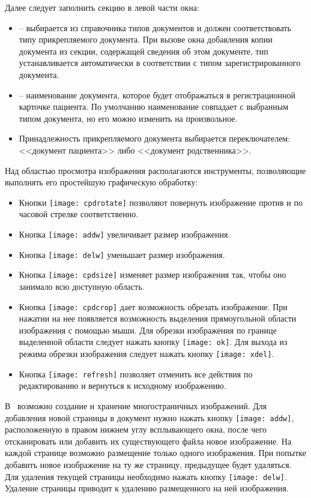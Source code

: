 {Далее следует заполнить секцию  в левой части окна:
\begin{itemize}
 \item {} -- выбирается из справочника типов документов и должен соответствовать типу прикрепляемого документа. При вызове окна добавления копии документа из секции, содержащей сведения об этом документе, тип устанавливается автоматически в соответствии с типом зарегистрированного документа. 
 \item {} -- наименование документа, которое будет отображаться в регистрационной карточке пациента. По умолчанию наименование совпадает с выбранным типом документа, но его можно изменить на произвольное.
 \item Принадлежность прикрепляемого документа выбирается переключателем: <<документ пациента>> либо <<документ родственника>>.
\end{itemize}

Над областью просмотра изображения располагаются инструменты, позволяющие выполнять его простейшую графическую обработку:
\begin{itemize}
 \item Кнопки \texttt{[image: cpdrotate]} позволяют повернуть изображение против и по часовой стрелке соответственно.
 \item Кнопка \texttt{[image: addw]} увеличивает размер изображения.
 \item Кнопка \texttt{[image: delw]} уменьшает размер изображения.
 \item Кнопка \texttt{[image: cpdsize]} изменяет размер изображения так, чтобы оно занимало всю доступную область.
 \item Кнопка \texttt{[image: cpdcrop]} дает возможность обрезать изображение. При нажатии на нее появляется возможность выделения прямоугольной области изображения с помощью мыши. Для обрезки изображения по границе выделенной области следует нажать кнопку \texttt{[image: ok]}. Для выхода из режима обрезки изображения следует нажать кнопку \texttt{[image: xdel]}.
 \item Кнопка \texttt{[image: refresh]} позволяет отменить все действия по редактированию и вернуться к исходному изображению.  
\end{itemize}

В \tmisp~возможно создание и хранение многостраничных изображений. Для добавления новой страницы в документ нужно нажать кнопку 
\texttt{[image: addw]}, расположенную в правом нижнем углу всплывающего окна, после чего отсканировать или добавить их существующего файла новое изображение.  На каждой странице возможно размещение только одного изображения. При попытке добавить новое изображение на ту же страницу, предыдущее будет удаляться. Для удаления текущей страницы необходимо нажать кнопку \texttt{[image: delw]}. Удаление страницы приводит к удалению размещенного на ней изображения.

}

